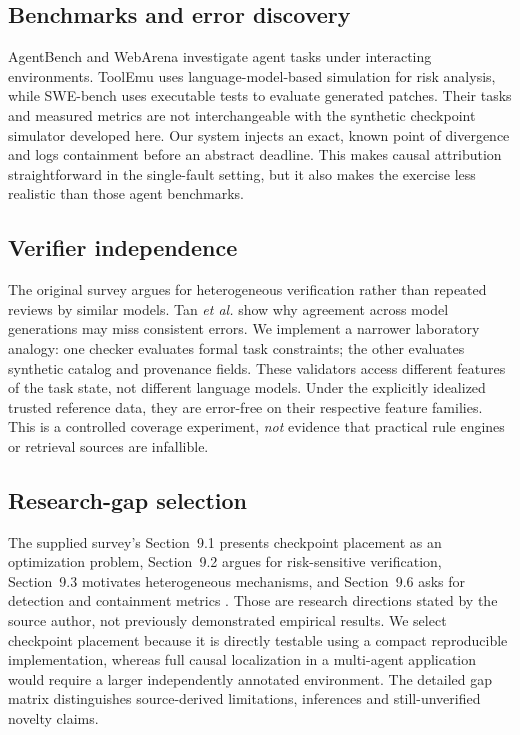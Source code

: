 \documentclass[conference]{IEEEtran}
\begin{document}
\subsection{Benchmarks and error discovery}
AgentBench \cite{liu2024agentbench} and WebArena \cite{zhou2024webarena} investigate agent tasks under interacting environments. ToolEmu \cite{ruan2024toolemu} uses language-model-based simulation for risk analysis, while SWE-bench \cite{jimenez2024swe} uses executable tests to evaluate generated patches. Their tasks and measured metrics are not interchangeable with the synthetic checkpoint simulator developed here. Our system injects an exact, known point of divergence and logs containment before an abstract deadline. This makes causal attribution straightforward in the single-fault setting, but it also makes the exercise less realistic than those agent benchmarks.

\subsection{Verifier independence}
The original survey argues for heterogeneous verification rather than repeated reviews by similar models. Tan \emph{et al.} \cite{tan2025consistent} show why agreement across model generations may miss consistent errors. We implement a narrower laboratory analogy: one checker evaluates formal task constraints; the other evaluates synthetic catalog and provenance fields. These validators access different features of the task state, not different language models. Under the explicitly idealized trusted reference data, they are error-free on their respective feature families. This is a controlled coverage experiment, \emph{not} evidence that practical rule engines or retrieval sources are infallible.

\subsection{Research-gap selection}
The supplied survey's Section~9.1 presents checkpoint placement as an optimization problem, Section~9.2 argues for risk-sensitive verification, Section~9.3 motivates heterogeneous mechanisms, and Section~9.6 asks for detection and containment metrics \cite{agrawal2026survey}. Those are research directions stated by the source author, not previously demonstrated empirical results. We select checkpoint placement because it is directly testable using a compact reproducible implementation, whereas full causal localization in a multi-agent application would require a larger independently annotated environment. The detailed gap matrix distinguishes source-derived limitations, inferences and still-unverified novelty claims.
\end{document}
